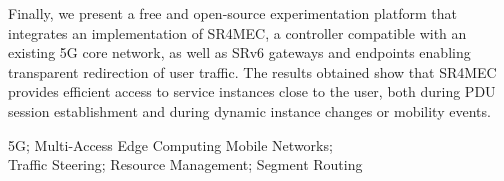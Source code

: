 \documentclass[../main.tex]{subfiles}
\begin{document}
\begin{resume}
\begin{enresume}
Finally, we present a free and open-source experimentation platform that integrates an implementation of SR4MEC, a controller compatible with an existing 5G core network, as well as SRv6 gateways and endpoints enabling transparent redirection of user traffic. The results obtained show that SR4MEC provides efficient access to service instances close to the user, both during PDU session establishment and during dynamic instance changes or mobility events. 
\end{enresume}

\begin{enresumeKeywords}
    5G; Multi-Access Edge Computing Mobile Networks; \\
    Traffic Steering; Resource Management; Segment Routing
\end{enresumeKeywords}
\end{resume}
\end{document}
